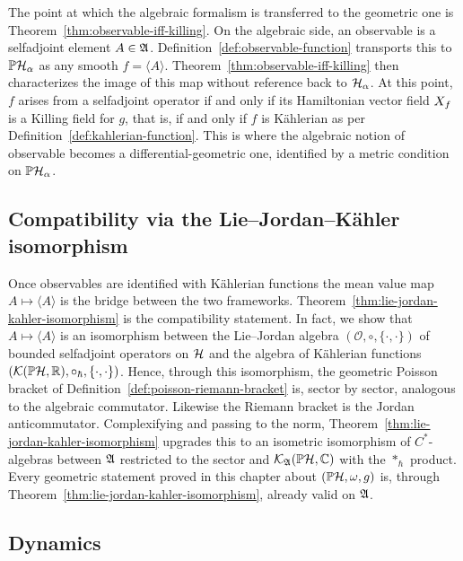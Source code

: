 The point at which the algebraic formalism is transferred to the geometric one is Theorem~\ref{thm:observable-iff-killing}. On the algebraic side, an observable is a selfadjoint element $A\in\mathfrak{A}$. Definition~\ref{def:observable-function} transports this to $\PH_\alpha$ as any smooth $f=\langle A\rangle$. Theorem~\ref{thm:observable-iff-killing} then characterizes the image of this map without reference back to $\H_\alpha$. At this point, $f$ arises from a selfadjoint operator if and only if its Hamiltonian vector field $X_{f}$ is a Killing field for $g$, that is, if and only if $f$ is Kählerian as per Definition~\ref{def:kahlerian-function}. This is where the algebraic notion of observable becomes a  differential-geometric one, identified by a metric condition on $\PH_\alpha$.


\subsection*{Compatibility via the Lie--Jordan--Kähler isomorphism}

Once observables are identified with Kählerian functions the mean value map $A\mapsto\langle A\rangle$ is the bridge between the two frameworks. Theorem~\ref{thm:lie-jordan-kahler-isomorphism} is the compatibility statement. In fact, we show that $A\mapsto\langle A\rangle$ is an isomorphism between the Lie--Jordan algebra $(\mathcal O,\circ,\{\cdot,\cdot\})$ of bounded selfadjoint operators on $\H$ and the algebra of Kählerian functions $(\mathcal K(\PH,\R),\circ_{\hbar},\poisson{\cdot}{\cdot})$. Hence, through this isomorphism, the geometric Poisson bracket of Definition~\ref{def:poisson-riemann-bracket} is, sector by sector, analogous to the algebraic commutator. Likewise the Riemann bracket is the Jordan anticommutator. Complexifying and passing to the norm, Theorem~\ref{thm:lie-jordan-kahler-isomorphism} upgrades this to an isometric isomorphism of $C^*$-algebras between $\mathfrak{A}$ restricted to the sector and $\mathcal K_\A(\PH,\C)$ with the $*_{\hbar}$ product. Every geometric statement proved in this chapter about $(\PH,\omega,g)$ is, through Theorem~\ref{thm:lie-jordan-kahler-isomorphism}, already valid on $\mathfrak{A}$.

\subsection*{Dynamics}

